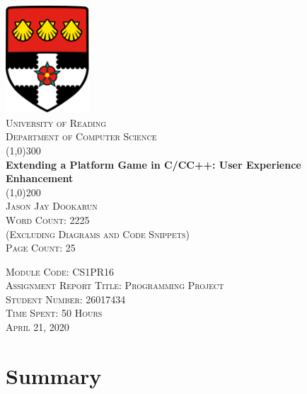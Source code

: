 \documentclass{article}
\begin{document}
\begin{titlepage}
    \begin{center}
        \includegraphics[height= 4cm ]{UoRlogo.png} \\
        [5mm]
        \textsc{\Large University of Reading} \\
        [0.5cm]
        \textsc{\Large Department of Computer Science} \\
        [1cm]

        \line(1,0){300}\\
        [0.25in]
        \huge{\bfseries Extending a Platform Game in C/CC++: User Experience Enhancement}\\
        [2mm]
        \line(1,0){200} \\
        [1cm]
        \textsc{\Large Jason Jay Dookarun} \\
        [2mm]
        \textsc{\large Word Count: 2225 } \\
        [0.2mm]
        \textsc{\large (Excluding Diagrams and Code Snippets)}\\
        [2mm]
        \textsc{\large Page Count: 25}\\
        [4cm]
        \end{center}
        \begin{flushright}
        \textsc{\normalsize Module Code: CS1PR16 \\
        Assignment Report Title: Programming Project \\
        Student Number: 26017434 \\
        Time Spent: 50 Hours \\
        April 21, 2020 } \\
        \end{flushright}
\end{titlepage}

\section*{Summary}
\end{document}
